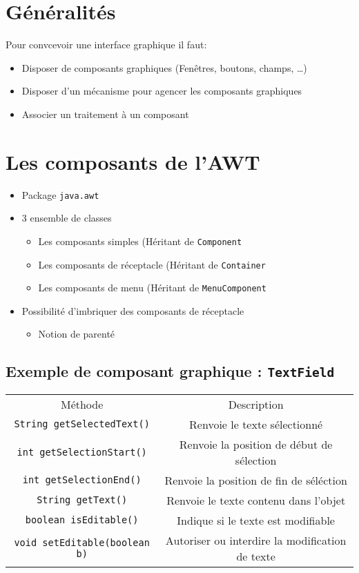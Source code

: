 \documentclass[12pt,a4paper,openany]{report}
\begin{document}
	\maketitle
	\section{Généralités}
		Pour convcevoir une interface graphique il faut:
		\begin{itemize}
			\item Disposer de composants graphiques (Fenêtres, boutons, champs, \ldots)
			\item Disposer d'un mécanisme pour agencer les composants graphiques
			\item Associer un traitement à un composant
		\end{itemize}
	\section{Les composants de l'AWT}
	\begin{itemize}
		\item Package \texttt{java.awt}
		\item 3 ensemble de classes
			\begin{itemize}
				\item Les composants simples (Héritant de \texttt{Component}
				\item Les composants de réceptacle (Héritant de \texttt{Container}
				\item Les composants de menu (Héritant de \texttt{MenuComponent}
			\end{itemize}
		\item Possibilité d'imbriquer des composants de réceptacle
			\begin{itemize}
				\item Notion de parenté
			\end{itemize}
	\end{itemize}
	\subsection{Exemple de composant graphique : \texttt{TextField}}
	\begin{tabular}{cc}
		Méthode & Description\\
		\texttt{String getSelectedText()} & Renvoie le texte sélectionné\\
		\texttt{int getSelectionStart()} & Renvoie la position de début de sélection \\
		\texttt{int getSelectionEnd()} & Renvoie la position de fin de séléction\\
		\texttt{String getText()} & Renvoie le texte contenu dans l'objet\\
		\texttt{boolean isEditable()} & Indique si le texte est modifiable \\
		\texttt{void setEditable(boolean b)} & Autoriser ou interdire la modification de texte\\
	\end{tabular}
\end{document}
